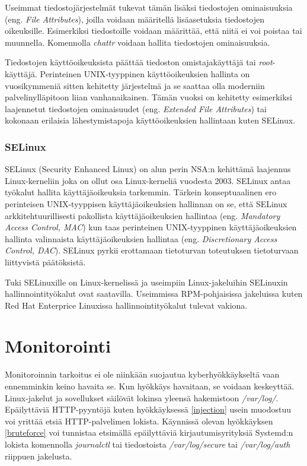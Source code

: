 Useimmat tiedostojärjestelmät tukevat tämän lisäksi tiedostojen ominaisuuksia (eng. \textit{File Attributes}), joilla voidaan määritellä lisäasetuksia tiedostojen oikeuksille. Esimerkiksi tiedostoille voidaan määrittää, että niitä ei voi poistaa tai muunnella. Komennolla \textit{chattr} voidaan hallita tiedostojen ominaisuuksia.

Tiedostojen käyttöoikeuksista päättää tiedoston omistajakäyttäjä tai \textit{root}-käyttäjä. Perinteinen UNIX-tyyppinen käyttöoikeuksien hallinta on vuosikymmeniä sitten kehitetty järjestelmä ja se saattaa olla moderniin palvelinylläpitoon liian vanhanaikainen. Tämän vuoksi on kehitetty esimerkiksi laajennetut tiedostojen ominaisuudet (eng. \textit{Extended File Attributes}) tai kokonaan erilaisia lähestymistapoja käyttöoikeuksien hallintaan kuten SELinux.~\cite{kalsi2018practical}

\subsubsection{SELinux}\label{selinux}
SELinux (Security Enhanced Linux) on alun perin NSA:n kehittämä laajennus Linux-kerneliin joka on ollut osa Linux-kerneliä vuodesta 2003. SELinux antaa työkalut hallita käyttäjäoikeuksia tarkemmin. Tärkein konseptuaalinen ero perinteisen UNIX-tyyppisen käyttäjäoikeuksien hallinnan on se, että SELinux arkkitehtuurillisesti pakollista käyttäjäoikeuksien hallintaa (eng. \textit{Mandatory Access Control, MAC}) kun taas perinteinen UNIX-tyyppinen käyttäjäoikeuksien hallinta valinnaista käyttäjäoikeuksien hallintaa (eng. \textit{Discretionary Access Control, DAC}). SELinux pyrkii erottamaan tietoturvan toteutuksen tietoturvaan liittyvistä päätöksistä.

Tuki SELinuxille on Linux-kernelissä ja useimpiin Linux-jakeluihin SELinuxin hallinnointityökalut ovat saatavilla. Useimmissa RPM-pohjaisissa jakeluissa kuten Red Hat Enterprice Linuxissa hallinnointityökalut tulevat vakiona.~\cite{selinux}

\section{Monitorointi}\label{monitorointi}
Monitoroinnin tarkoitus ei ole niinkään suojautua kyberhyökkäykseltä vaan ennemminkin keino havaita se. Kun hyökkäys havaitaan, se voidaan keskeyttää. Linux-jakelut ja sovellukset säilövät lokinsa yleensä hakemistoon \textit{/var/log/}. Epäilyttäviä HTTP-pyyntöjä kuten hyökkäyksessä \ref{injection} usein muodostuu voi yrittää etsiä HTTP-palvelimen lokista. Käynnissä olevan hyökkäyksen \ref{bruteforce} voi tunnistaa etsimällä epäilyttäviä kirjautumisyrityksiä Systemd:n lokista komennolla \textit{journalctl} tai tiedostoista \textit{/var/log/secure} tai \textit{/var/log/auth} riippuen jakelusta. 

